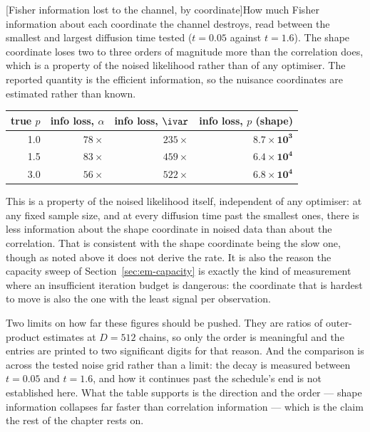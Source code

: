 \begin{center}
\begin{minipage}{\linewidth}\centering
{}[Fisher information lost to the channel, by coordinate]{How much Fisher information about each coordinate the channel destroys, read between the smallest and largest diffusion time tested ($t = 0.05$ against $t = 1.6$). The shape coordinate loses two to three orders of magnitude more than the correlation does, which is a property of the noised likelihood rather than of any optimiser. The reported quantity is the efficient information, so the nuisance coordinates are estimated rather than known.}
\label{tab:em-information}
\begin{tabular}{@{}rrrr@{}}
\toprule
true $p$ & info loss, $\alpha$ & info loss, $\ivar$ & info loss, $p$ (shape) \\
\midrule
1.0 & $78\times$ & $235\times$ & $\mathbf{8.7\times10^{3}}$ \\
1.5 & $83\times$ & $459\times$ & $\mathbf{6.4\times10^{4}}$ \\
3.0 & $56\times$ & $522\times$ & $\mathbf{6.8\times10^{4}}$ \\
\bottomrule
\end{tabular}
\end{minipage}
\end{center}
\noindent This is a property of the noised likelihood itself, independent of
any optimiser: at any fixed sample size, and at every diffusion time past the
smallest ones, there is less information about the shape coordinate in noised
data than about the correlation. That is consistent with the shape coordinate
being the slow one, though as noted above it does not derive the rate. It is also the reason
the capacity sweep of Section~\ref{sec:em-capacity} is exactly the kind of
measurement where an insufficient iteration budget is dangerous: the
coordinate that is hardest to move is also the one with the least signal per
observation.

Two limits on how far these figures should be pushed. They are ratios of
outer-product estimates at $D=512$ chains, so only the order is meaningful
and the entries are printed to two significant digits for that reason. And the
comparison is across the tested noise grid rather than a limit: the decay
is measured between $t=0.05$ and $t=1.6$, and how it continues past the
schedule's end is not established here. What the table supports is the
direction and the order --- shape information collapses far faster than
correlation information --- which is the claim the rest of the chapter
rests on.

